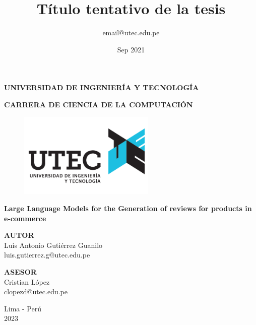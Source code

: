 \documentclass{report}
\title{Título tentativo de la tesis}
\author{email@utec.edu.pe}
\date{Sep 2021}
\begin{document}
\begin{titlepage}
    \begin{center}
        \Large
        \textbf{UNIVERSIDAD DE INGENIERÍA Y TECNOLOGÍA}
        \vspace*{0.9cm}

        \large
        \textbf{CARRERA DE CIENCIA DE LA COMPUTACIÓN}
        \vspace*{0.9cm}

        \begin{figure}[htbp]
            \centering
            \includegraphics[width=6.5cm,height=\textheight,keepaspectratio]{images/logo}
        \end{figure}

        \LARGE
        \textbf{Large Language Models for the Generation of reviews for products in e-commerce}

        \vspace{0.9cm}
        \Large


        \textbf{AUTOR}
        \vspace{0.5cm}
        \\Luis Antonio Guti\'errez Guanilo
        \\luis.gutierrez.g@utec.edu.pe
        \vfill

        \vspace{1.0cm}

        \textbf{ASESOR}
        \vspace{0.5cm}
        \\Cristian López
        \\clopezd@utec.edu.pe
        \vfill
        \vspace{0.8cm}
        \Large

        Lima - Perú
        \\
        2023

    \end{center}
\end{titlepage}


\end{document}
